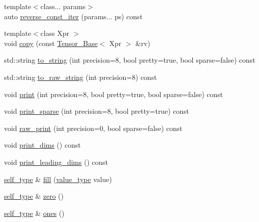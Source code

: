 \begin{DoxyCompactItemize}
\item 
{\footnotesize template$<$class... params$>$ }\\auto \hyperlink{classbc_1_1tensors_1_1Tensor__Base_af4f68f420bf8b8f98addaf1ed8916ce3}{reverse\+\_\+const\+\_\+iter} (params... ps) const
\item 
{\footnotesize template$<$class Xpr $>$ }\\void \hyperlink{classbc_1_1tensors_1_1Tensor__Base_acbfafa3362eee3a444d847bbf23922df}{copy} (const \hyperlink{classbc_1_1tensors_1_1Tensor__Base}{Tensor\+\_\+\+Base}$<$ Xpr $>$ \&rv)
\item 
std\+::string \hyperlink{classbc_1_1tensors_1_1Tensor__Base_ae7c9eff826ecb4b78bd4bc23020201b6}{to\+\_\+string} (int precision=8, bool pretty=true, bool sparse=false) const
\item 
std\+::string \hyperlink{classbc_1_1tensors_1_1Tensor__Base_a5545f38f28891235f7cf3595c8dcbb17}{to\+\_\+raw\+\_\+string} (int precision=8) const
\item 
void \hyperlink{classbc_1_1tensors_1_1Tensor__Base_a0f01e3b10287208016ae202e823c619e}{print} (int precision=8, bool pretty=true, bool sparse=false) const
\item 
void \hyperlink{classbc_1_1tensors_1_1Tensor__Base_afb967f955b7d94975e0772708f9089f8}{print\+\_\+sparse} (int precision=8, bool pretty=true) const
\item 
void \hyperlink{classbc_1_1tensors_1_1Tensor__Base_af16daf441642b2c0bb573530f41190f1}{raw\+\_\+print} (int precision=0, bool sparse=false) const
\item 
void \hyperlink{classbc_1_1tensors_1_1Tensor__Base_a383b38d30106f3c1a30faace2c4dc2f8}{print\+\_\+dims} () const
\item 
void \hyperlink{classbc_1_1tensors_1_1Tensor__Base_a87110cc0533295db448dcd80e711de90}{print\+\_\+leading\+\_\+dims} () const
\item 
\hyperlink{classbc_1_1tensors_1_1Expression__Base}{self\+\_\+type} \& \hyperlink{classbc_1_1tensors_1_1Tensor__Base_a7deaede9355e6081f561b90d1f6dee7c}{fill} (\hyperlink{classbc_1_1tensors_1_1Expression__Base_acda5b4e228c9b3cb9174258d5caf860a}{value\+\_\+type} value)
\item 
\hyperlink{classbc_1_1tensors_1_1Expression__Base}{self\+\_\+type} \& \hyperlink{classbc_1_1tensors_1_1Tensor__Base_abb334d0f7c42f2fefb945c59e24e9572}{zero} ()
\item 
\hyperlink{classbc_1_1tensors_1_1Expression__Base}{self\+\_\+type} \& \hyperlink{classbc_1_1tensors_1_1Tensor__Base_a5a1eb24a1cfd808939b9782404ceccc4}{ones} ()

\end{DoxyCompactItemize}
